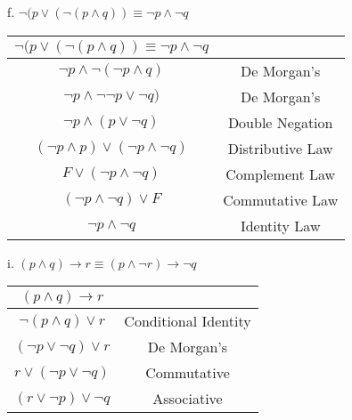 \documentclass[11pt]{article}
\begin{document}
{\begin{center}
\begin{tabular}{ |c|c| }
 \hline
\end{tabular}
\end{center}  
f. ${\displaystyle \neg} (p \vee ({\displaystyle \neg }(p \wedge q)) \equiv {\displaystyle \neg } p \wedge {\displaystyle \neg } q $\\
\begin{center}
\begin{tabular}{ |c|c| } 
 \hline
 ${\displaystyle \neg} (p \vee ({\displaystyle \neg }(p \wedge q)) \equiv {\displaystyle \neg } p \wedge {\displaystyle \neg } q $
 & \space \\
 \hline
 ${ \displaystyle \neg} p \wedge {\displaystyle \neg}( {\displaystyle \neg} p \wedge q) $ & De Morgan's\\
 \hline
 ${ \displaystyle \neg} p \wedge {\displaystyle \neg}{\displaystyle \neg} p \vee {\displaystyle \neg} q)$ & De Morgan's \\
 \hline
${ \displaystyle \neg} p \wedge  (p \vee {\displaystyle \neg} q)$ & Double Negation\\
\hline
$({ \displaystyle \neg} p \wedge p) \vee ( {\displaystyle \neg} p \wedge {\displaystyle \neg} q)$ & Distributive Law\\
\hline
$F \vee ( {\displaystyle \neg} p \wedge {\displaystyle \neg} q)$ & Complement Law\\
 \hline
 $( {\displaystyle \neg} p \wedge {\displaystyle \neg} q) \vee F$ & Commutative Law\\
 \hline
  $ {\displaystyle \neg} p \wedge {\displaystyle \neg} q$ & Identity Law\\
 \hline
\end{tabular}
\end{center}   
i. $(p \wedge q) \rightarrow r \equiv (p \wedge {\displaystyle \neg } r) \rightarrow {\displaystyle \neg} q $\\
\begin{center}
\begin{tabular}{ |c|c| } 
 \hline
$ (p \wedge q) \rightarrow r$ & \space \\
 \hline
$ {\displaystyle \neg}(p \wedge q) \vee r$  & Conditional Identity\\
 \hline
 $({ \displaystyle \neg} p \vee {\displaystyle \neg} q) \vee r $ & De Morgan's \\
 \hline
$ r  \vee  ({\displaystyle \neg} p \vee {\displaystyle \neg} q)$ & Commutative\\
\hline
$ (r  \vee  {\displaystyle \neg} p) \vee {\displaystyle \neg} q$ & Associative\\

\end{tabular}
\end{center}}
\end{document}
